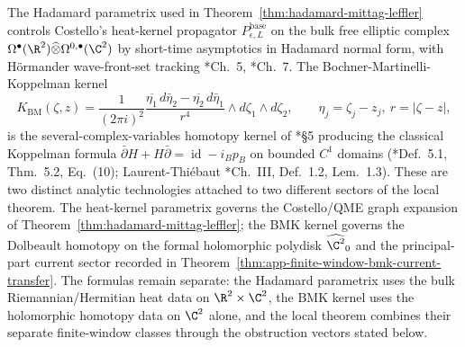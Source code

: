 \begin{rmk}\label{rmk:hadamard-vs-bmk}
  The Hadamard parametrix used in
  Theorem~\ref{thm:hadamard-mittag-leffler} controls Costello's
  heat-kernel propagator \(P_{\epsilon,L}^{\mathrm{base}}\) on the bulk
  free elliptic complex
  \(\Omega^\bullet(\R^2)\widehat\otimes\Omega^{0,\bullet}(\C^2)\) by
  short-time asymptotics in Hadamard normal form, with Hörmander
  wave-front-set tracking
  \cite{costello-renormalization}*{Ch.~5},
  \cite{hormander-vol1}*{Ch.~7}.  The Bochner-Martinelli-Koppelman
  kernel
  \[
    K_{\mathrm{BM}}(\zeta,z)
      =
    \frac{1}{(2\pi i)^2}
    \frac{
      \overline{\eta_1}\,d\bar\eta_2-\overline{\eta_2}\,d\bar\eta_1
    }{r^4}
    \wedge d\zeta_1\wedge d\zeta_2,
    \qquad
    \eta_j=\zeta_j-z_j,\ r=|\zeta-z|,
  \]
  is the several-complex-variables homotopy kernel of
  \cite{ruppenthal-bmk}*{\S5} producing the classical Koppelman
  formula
  \(\bar\partial H+H\bar\partial=\operatorname{id}-i_Bp_B\) on bounded
  \(C^1\) domains
  (\cite{ruppenthal-bmk}*{Def.~5.1, Thm.~5.2, Eq.~(10)};
  Laurent-Thiébaut \cite{laurent-thiebaut-bmk}*{Ch.~III, Def.~1.2,
  Lem.~1.3}).  These are two distinct analytic technologies attached
  to two different sectors of the local theorem.  The heat-kernel
  parametrix governs the Costello/QME graph expansion of
  Theorem~\ref{thm:hadamard-mittag-leffler}; the BMK kernel governs the
  Dolbeault homotopy on the formal holomorphic polydisk
  \(\widehat{\C^2}_0\) and the principal-part current sector recorded in
  Theorem~\ref{thm:app-finite-window-bmk-current-transfer}.  The formulas
  remain separate: the Hadamard parametrix uses the bulk
  Riemannian/Hermitian heat data on \(\R^2\times\C^2\), the BMK kernel
  uses the holomorphic homotopy data on \(\C^2\) alone, and the local
  theorem combines their separate finite-window classes through the
  obstruction vectors stated below.
\end{rmk}

